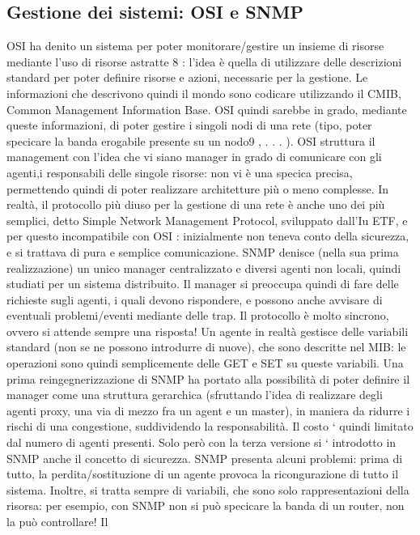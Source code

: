 \subsection{Gestione dei sistemi: OSI e SNMP}
OSI ha denito un sistema per poter monitorare/gestire un insieme di risorse
mediante l'uso di risorse astratte 8 : l'idea è quella di utilizzare delle descrizioni
standard per poter definire risorse e azioni, necessarie per la gestione. Le informazioni che descrivono quindi il mondo
sono codicare utilizzando il CMIB,
Common Management Information Base. OSI quindi sarebbe in grado, mediante queste informazioni, di poter gestire i
singoli nodi di una rete (tipo, poter
specicare la banda erogabile presente su un nodo9 , . . . ). OSI struttura il management con l'idea che vi siano manager
in grado di comunicare con gli agenti,i
responsabili delle singole risorse: non vi è una specica precisa, permettendo
quindi di poter realizzare architetture più o meno complesse.
In realtà, il protocollo più diuso per la gestione di una rete è anche uno
dei più semplici, detto Simple Network Management Protocol, sviluppato dall'Iu
ETF, e per questo incompatibile con OSI : inizialmente non teneva conto della
sicurezza, e si trattava di pura e semplice comunicazione.
SNMP denisce (nella sua prima realizzazione) un unico manager centralizzato e diversi agenti non locali, quindi studiati
per un sistema distribuito. Il
manager si preoccupa quindi di fare delle richieste sugli agenti, i quali devono
rispondere, e possono anche avvisare di eventuali problemi/eventi mediante delle
trap. Il protocollo è molto sincrono, ovvero si attende sempre una risposta!
Un agente in realtà gestisce delle variabili standard (non se ne possono
introdurre di nuove), che sono descritte nel MIB: le operazioni sono quindi
semplicemente delle GET e SET su queste variabili.
Una prima reingegnerizzazione di SNMP ha portato alla possibilità di poter
definire il manager come una struttura gerarchica (sfruttando l'idea di realizzare
degli agenti proxy, una via di mezzo fra un agent e un master), in maniera da
ridurre i rischi di una congestione, suddividendo la responsabilità. Il costo `
quindi limitato dal numero di agenti presenti. Solo però con la terza versione si
` introdotto in SNMP anche il concetto di sicurezza.
SNMP presenta alcuni problemi: prima di tutto, la perdita/sostituzione di
un agente provoca la ricongurazione di tutto il sistema. Inoltre, si tratta sempre di variabili, che sono solo
rappresentazioni della risorsa: per esempio, con
SNMP non si può specicare la banda di un router, non la può controllare! Il
